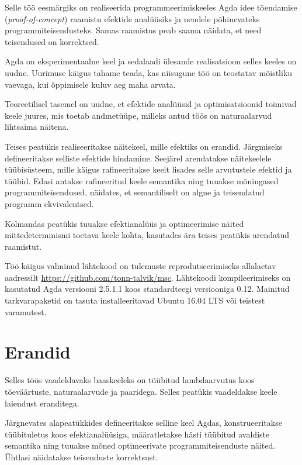 \documentclass[a4paper,12pt]{article}
\begin{document}
Selle töö eesmärgiks on realiseerida programmeerimiskeeles Agda idee tõendamise (\emph{proof-of-concept}) 
raamistu efektide analüüsiks ja nendele põhinevateks programmiteisendusteks.
Samas raamistus peab saama näidata, et need \iffalse analüüsid ja \fi teisendused on korrektsed.

Agda on eksperimentaalne keel ja sedalaadi ülesande realisatsioon selles keeles on uudne.
Uurimuse käigus tahame teada, kas niisugune töö on teostatav mõistliku vaevaga, kui õppimisele kuluv aeg maha arvata.

Teoreetilisel tasemel on uudne, et efektide analüüsid ja optimisatsioonid toimivad keele juures, mis toetab andmetüüpe, milleks antud töös on naturaalarvud lihtsaima näitena.

Teises peatükis realiseeritakse näitekeel, mille efektiks on erandid.
Järgmiseks defineeritakse selliste efektide hindamine.
Seejärel arendatakse näitekeelele tüübisüsteem, mille käigus rafineeritakse keelt lisades selle arvutustele efektid ja tüübid.
Edasi antakse rafineeritud keele semantika ning tuuakse mõningased programmiteisendused, näidates, et semantiliselt on algne ja teisendatud programm ekvivalentsed.

Kolmandas peatükis tuuakse efektianalüüs ja optimeerimise näited mittedeterminismi toetava keele kohta, kasutades ära teises peatükis arendatud raamistut.

Töö käigus valminud lähtekood on tulemuste reprodutseerimiseks allalaetav aadressilt \url{https://github.com/tonn-talvik/msc}.
Lähtekoodi kompileerimiseks on kasutatud Agda versiooni 2.5.1.1 koos standardteegi versiooniga 0.12.
Mainitud tarkvarapaketid on tasuta installeeritavad Ubuntu 16.04 LTS või teistest varamutest.

\clearpage\vspace*{0pt}

\section{Erandid}\label{sec:exc}

Selles töös vaadeldavaks baaskeeleks on tüübitud lambdaarvutus koos tõeväärtuste, naturaalarvude ja paaridega.
Selles peatükis vaadeldakse keele laiendust eranditega. 

Järgnevates alapeatükkides defineeritakse selline keel Agdas,
konstrueeritakse tüübituletus koos efektianalüüsiga,
määratletakse hästi tüübitud avaldiste semantika
ning tuuakse mõned optimeerivate programmiteisenduste näited.
Ühtlasi näidatakse \iffalse analüüsi ja\fi teisenduste korrektsust.
\end{document}

